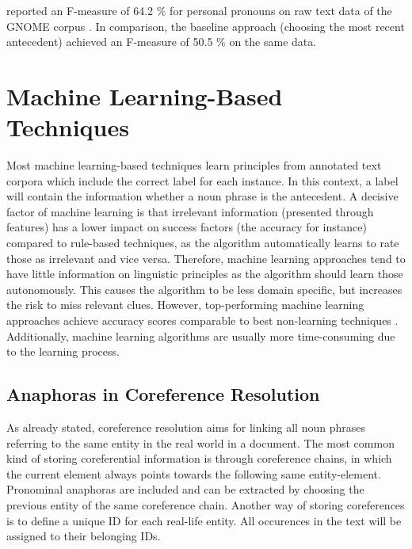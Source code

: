 \citep{poesio2004mate} reported an F-measure of 64.2 \% for personal pronouns on raw text data of the GNOME corpus \citep{poesio2004general}. In comparison, the baseline approach (choosing the most recent antecedent) achieved an F-measure of 50.5 \% on the same data.

\section{Machine Learning-Based Techniques}

Most machine learning-based techniques learn principles from annotated text corpora \citep{soon2001machine, bergsma2005automatic} which include the correct label for each instance. In this context, a label will contain the information whether a noun phrase is the antecedent. A decisive factor of machine learning is that irrelevant information (presented through features) has a lower impact on success factors (the accuracy for instance) compared to rule-based techniques, as the algorithm automatically learns to rate those as irrelevant and vice versa. Therefore, machine learning approaches tend to have little information on linguistic principles as the algorithm should learn those autonomously. This causes the algorithm to be less domain specific, but increases the risk to miss relevant clues. However, top-performing machine learning approaches achieve accuracy scores comparable to best non-learning techniques \citep{soon2001machine}. \\
Additionally, machine learning algorithms are usually more time-consuming due to the learning process.

\subsection{Anaphoras in Coreference Resolution}
\label{soon2001traininginstances} %

As already stated, coreference resolution aims for linking all noun phrases referring to the same entity in the real world in a document. The most common kind of storing coreferential information is through coreference chains, in which the current element always points towards the following same entity-element. Pronominal anaphoras are included and can be extracted by choosing the previous entity of the same coreference chain. Another way of storing coreferences is to define a unique ID for each real-life entity. All occurences in the text will be assigned to their belonging IDs.

